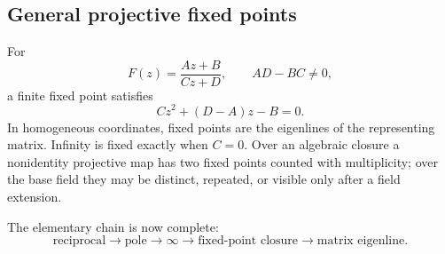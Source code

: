 \subsection{General projective fixed points}

For
\[
  F(z)=\frac{Az+B}{Cz+D},
  \qquad AD-BC\ne0,
\]
a finite fixed point satisfies
\begin{equation}\label{eq:p0-general-mobius-fixed-point}
  Cz^2+(D-A)z-B=0.
\end{equation}
In homogeneous coordinates, fixed points are the eigenlines of the representing
matrix.  Infinity is fixed exactly when $C=0$.  Over an algebraic closure a
nonidentity projective map has two fixed points counted with multiplicity;
over the base field they may be distinct, repeated, or visible only after a
field extension.

The elementary chain is now complete:
\[
  \text{reciprocal}
  \longrightarrow
  \text{pole}
  \longrightarrow
  \infty
  \longrightarrow
  \text{fixed-point closure}
  \longrightarrow
  \text{matrix eigenline}.
\]
